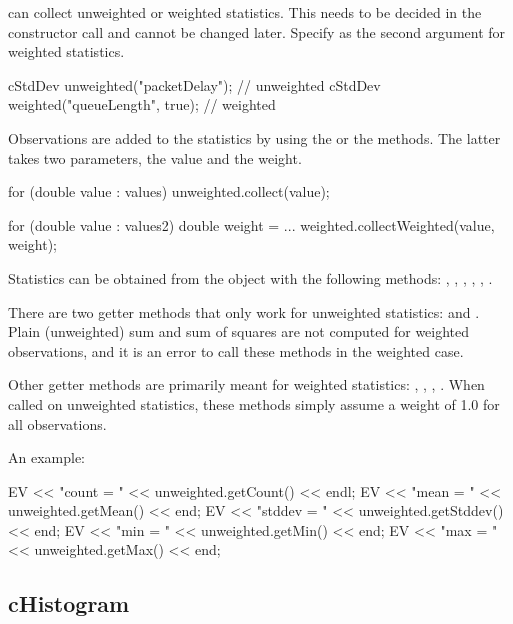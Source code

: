  can collect unweighted or weighted statistics. This needs
to be decided in the constructor call and cannot be changed later.
Specify  as the second argument for weighted statistics.

\begin{cpp}
cStdDev unweighted("packetDelay");  // unweighted
cStdDev weighted("queueLength", true); // weighted
\end{cpp}

Observations are added to the statistics by using the 
or the  methods. The latter takes two parameters,
the value and the weight.

\begin{cpp}
for (double value : values)
    unweighted.collect(value);

for (double value : values2) {
    double weight = ...
    weighted.collectWeighted(value, weight);
}
\end{cpp}

Statistics can be obtained from the object with the following methods:
, , , ,
, .

There are two getter methods that only work for unweighted statistics:
 and . Plain (unweighted) sum and
sum of squares are not computed for weighted observations, and it is
an error to call these methods in the weighted case.

Other getter methods are primarily meant for weighted statistics:
, ,
, .
When called on unweighted statistics, these methods simply
assume a weight of 1.0 for all observations.

An example:

\begin{cpp}
EV << "count = " << unweighted.getCount() << endl;
EV << "mean = " << unweighted.getMean() << end;
EV << "stddev = " << unweighted.getStddev() << end;
EV << "min = " << unweighted.getMin() << end;
EV << "max = " << unweighted.getMax() << end;
\end{cpp}


\subsection{cHistogram}
\label{sec:sim-lib:histograms}


